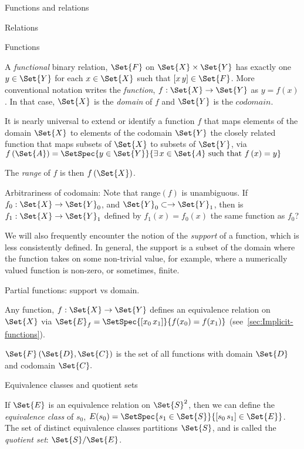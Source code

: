 \begin{plSection}{Functions and relations}
\begin{plSection}{Relations}
\end{plSection}%
\begin{plSection}{Functions}
\label{sec:Functions}

A \textit{functional} binary relation, $\Set{F}$ on $\Set{X}
\times \Set{Y}$ has exactly one $y \in \Set{Y}$ for each
$x \in \Set{X}$ such that $[x \, y] \in \Set{F}$.
More conventional notation writes the \textit{function}, 
$f : \Set{X} \rightarrow \Set{Y}$ as $y = f(x)$.
In that case, $\Set{X}$ is the \textit{domain} of $f$
and $\Set{Y}$ is the $codomain$.

It is nearly universal to extend or identify a function $f$ that maps 
elements of the domain $\Set{X}$
to elements of 
the codomain $\Set{Y}$
the closely related function that maps
subsets of $\Set{X}$ to subsets of $\Set{Y}$,
via $f\left( \Set{A} \right) = 
\SetSpec{y \in \Set{Y}}{\exists \, x \in \Set{A} 
\text{ such that } f\left( x \right) = y}$

The \textit{range} of $f$ is then $f\left( \Set{X} \right)$.

Arbitrariness of codomain:
Note that $\text{range}\left( f \right)$ 
is unambiguous.
If  $f_0 : \Set{X} \rightarrow \Set{Y}_0$,
and $\Set{Y}_0 \subset \rightarrow \Set{Y}_1$,
then is $f_1 : \Set{X} \rightarrow \Set{Y}_1$
defined by $f_1(x) = f_0(x)$
the same function as $f_0$?

We will also frequently encounter the notion of the 
\textit{support} of a function, which is less consistently
defined. In general, the support is a subset of the domain
where the function takes on some non-trivial value, for example,
where a numerically valued function is non-zero, or sometimes,
finite.

Partial functions: support vs domain.

Any function, $f : \Set{X} \rightarrow \Set{Y}$ defines an
equivalence relation on $\Set{X}$ via 
$\Set{E}_f = \SetSpec{[x_0 \, x_1]}{f(x_0) = f(x_1)}$
(see~\ref{sec:Implicit-functions}).

$\Set{F}\left( \Set{D}, \Set{C} \right)$ is the set of all 
functions with domain $\Set{D}$ and codomain $\Set{C}.$

\end{plSection}%
\begin{plSection}{Equivalence classes and quotient sets}

If $\Set{E}$ is an equivalence relation on $\Set{S}^2$, then we
can define the \textit{equivalence class} of $s_0$, 
$E(s_0) = \SetSpec{s_1 \in \Set{S}}{[s_0 \, s_1] \in \Set{E} }$.
The set of distinct equivalence classes partitions $\Set{S}$,
and is called the \textit{quotient set}: $\Set{S} / \Set{E}$.


\end{plSection}
\end{plSection}
